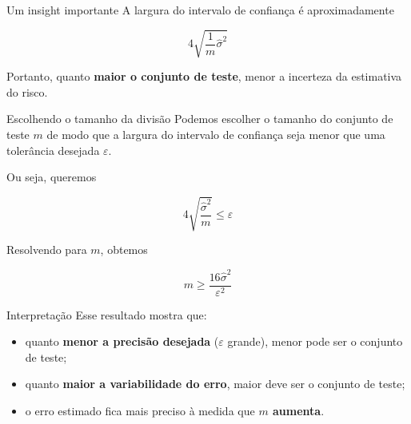\documentclass[
  ignorenonframetext,
  aspectratio=169,
]{beamer}
\providecommand{\tightlist}{%
  \setlength{\itemsep}{0pt}\setlength{\parskip}{0pt}}
\begin{document}
\begin{frame}
\begin{block}{Um insight importante}
\label{um-insight-importante}
A largura do intervalo de confiança é aproximadamente

\[
4\sqrt{\frac{1}{m}\hat{\sigma}^2}
\]

Portanto, quanto \textbf{maior o conjunto de teste}, menor a incerteza
da estimativa do risco.
\end{block}
\end{frame}

\begin{frame}
\begin{block}{Escolhendo o tamanho da divisão}
\label{escolhendo-o-tamanho-da-divisuxe3o}
Podemos escolher o tamanho do conjunto de teste \(m\) de modo que a
largura do intervalo de confiança seja menor que uma tolerância desejada
\(\varepsilon\).

Ou seja, queremos

\[
4\sqrt{\frac{\hat{\sigma}^2}{m}} \le \varepsilon
\]

Resolvendo para \(m\), obtemos

\[
m \ge \frac{16\hat{\sigma}^2}{\varepsilon^2}
\]
\end{block}
\end{frame}

\begin{frame}
\begin{block}{Interpretação}
\label{interpretauxe7uxe3o-7}
Esse resultado mostra que:

\begin{itemize}
\tightlist
\item
  quanto \textbf{menor a precisão desejada} (\(\varepsilon\) grande),
  menor pode ser o conjunto de teste;
\item
  quanto \textbf{maior a variabilidade do erro}, maior deve ser o
  conjunto de teste;
\item
  o erro estimado fica mais preciso à medida que \textbf{\(m\) aumenta}.
\end{itemize}
\end{block}
\end{frame}
\end{document}
